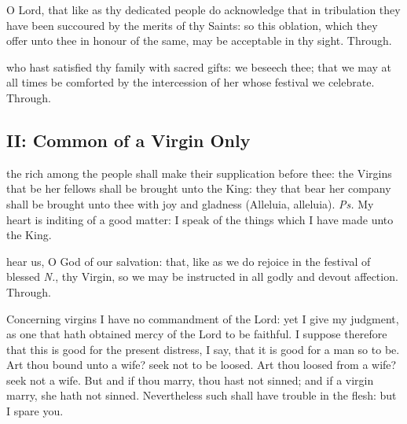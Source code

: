 
\secret\label{CommonVirginOnlyISecret}
 O Lord, that like as thy dedicated people do acknowledge that in tribulation they have been succoured by the merits of thy Saints: so this oblation, which they offer unto thee in honour of the same, may be acceptable in thy sight. Through.



\postcommunion\label{CommonVirginOnlyIPostcommunion}
 who hast satisfied thy family with sacred gifts: we beseech thee; that we may at all times be comforted by the intercession of her whose festival we celebrate. Through.


\subsection{II: Common of a Virgin Only}\label{CommonVirginOnlyII}

\introit
{} the rich among the people shall make their supplication before thee: the Virgins that be her fellows shall be brought unto the King: they that bear her company shall be brought unto thee with joy and gladness (Alleluia, alleluia). \textit{Ps.} My heart is inditing of a good matter: I speak of the things which I have made unto the King.

\collect
{} hear us, O God of our salvation: that, like as we do rejoice in the festival of blessed \textit{N.}, thy Virgin, so we may be instructed in all godly and devout affection. Through.

 Concerning virgins I have no commandment of the Lord: yet I give my judgment, as one that hath obtained mercy of the Lord to be faithful. I suppose therefore that this is good for the present distress, I say, that it is good for a man so to be. Art thou bound unto a wife? seek not to be loosed. Art thou loosed from a wife? seek not a wife. But and if thou marry, thou hast not sinned; and if a virgin marry, she hath not sinned. Nevertheless such shall have trouble in the flesh: but I spare you.

